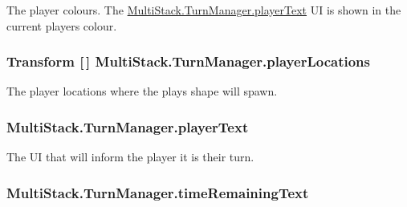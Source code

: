 The player colours. The \hyperlink{class_multi_stack_1_1_turn_manager_a498a14eba4b58bc373456efba57302fa}{Multi\+Stack.\+Turn\+Manager.\+player\+Text} U\+I is shown in the current players colour. 

\hypertarget{class_multi_stack_1_1_turn_manager_a4693285de295363939a9f454ac6a5e5b}{}
\subsubsection[{player\+Locations}]{\setlength{\rightskip}{0pt plus 5cm}Transform \mbox{[}$\,$\mbox{]} Multi\+Stack.\+Turn\+Manager.\+player\+Locations}\label{class_multi_stack_1_1_turn_manager_a4693285de295363939a9f454ac6a5e5b}


The player locations where the plays shape will spawn. 

\hypertarget{class_multi_stack_1_1_turn_manager_a498a14eba4b58bc373456efba57302fa}{}
\subsubsection[{player\+Text}]{ Multi\+Stack.\+Turn\+Manager.\+player\+Text}\label{class_multi_stack_1_1_turn_manager_a498a14eba4b58bc373456efba57302fa}


The U\+I that will inform the player it is their turn. 

\hypertarget{class_multi_stack_1_1_turn_manager_a2084e64bcf723c4d9d46960f18c26368}{}
\subsubsection[{time\+Remaining\+Text}]{ Multi\+Stack.\+Turn\+Manager.\+time\+Remaining\+Text}\label{class_multi_stack_1_1_turn_manager_a2084e64bcf723c4d9d46960f18c26368}


